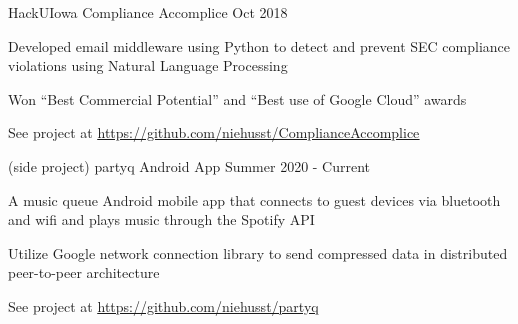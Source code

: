 \documentclass[12pt, a4paper]{awesome-cv}
\begin{document}
\begin{cventries}

    \cventry
	{HackUIowa}
 	{Compliance Accomplice}
	{Oct 2018}
	{}
	{
	  \begin{cvitems}
	     \item{Developed email middleware using Python to detect and prevent SEC compliance violations using Natural Language Processing}
	     \item{Won “Best Commercial Potential” and “Best use of Google Cloud” awards}
	     \item{See project at \underline{\href{https://github.com/niehusst/ComplianceAccomplice}{https://github.com/niehusst/ComplianceAccomplice}}} 
	  \end{cvitems}
	}

  \cventry
    {(side project)}
    {partyq Android App}
    {Summer 2020 - Current}
    {}
    {
      \begin{cvitems}
        \item{A music queue Android mobile app that connects to guest devices via bluetooth and wifi and plays music through the Spotify API}
        \item{Utilize Google network connection library to send compressed data in distributed peer-to-peer architecture}
        \item{See project at \underline{\href{https://github.com/niehusst/partyq}{https://github.com/niehusst/partyq}}}
      \end{cvitems}
    }




\end{cventries}
\end{document}
